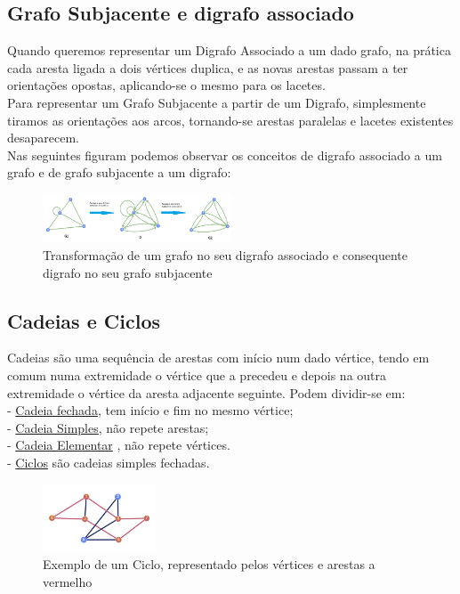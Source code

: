 \subsection{Grafo Subjacente e digrafo associado}
Quando queremos representar um Digrafo Associado a um dado grafo, na prática cada aresta ligada a 
dois vértices duplica, e as novas arestas passam a ter orientações opostas, aplicando-se o mesmo para os 
lacetes.\\
\indent Para representar um Grafo Subjacente a partir de um Digrafo, simplesmente tiramos as orientações aos 
arcos, tornando-se arestas paralelas e lacetes existentes desaparecem.\\
\indent Nas seguintes figuram podemos observar os conceitos de digrafo associado a um grafo e de grafo 
subjacente a um digrafo:\\

\begin{figure}[h]
    \centering
    \includegraphics[width=0.5\textwidth]{imgs/Figura8}
    \caption{Transformação de um grafo no seu digrafo associado e consequente digrafo no seu grafo 
    subjacente
    \label{fig:imagem8}}
\end{figure}
\subsection{ Cadeias e Ciclos}
Cadeias são uma sequência de arestas com início num dado vértice, tendo em comum numa extremidade 
o vértice que a precedeu e depois na outra extremidade o vértice da aresta adjacente seguinte. Podem 
dividir-se em:\\
\indent - \underline{Cadeia fechada}, tem início e fim no mesmo vértice;\\
\indent - \underline{Cadeia Simples}, não repete arestas;\\
\indent - \underline{Cadeia Elementar} , não repete vértices.\\
\indent - \underline{Ciclos} são cadeias simples fechadas.\\

\begin{figure}[h]
    \centering
    \includegraphics[width=0.3\textwidth]{imgs/Figura9}
    \caption{ Exemplo de um Ciclo, representado pelos vértices e arestas a vermelho\label{fig:imagem9}}
\end{figure}
\clearpage

